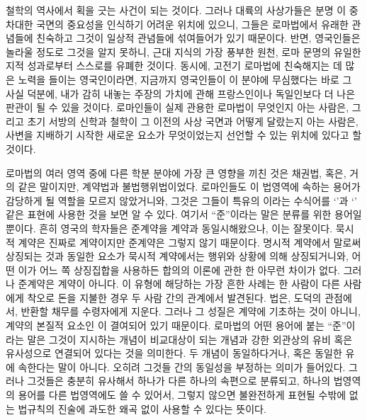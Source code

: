 철학의 역사에서 획을 긋는 사건이 되는 것이다.
그러나 대륙의 사상가들은
분명 이 중차대한 국면의 중요성을 인식하기 어려운 위치에 있으니,
그들은 로마법에서 유래한 관념들에 친숙하고
그것이 일상적 관념들에 섞여들어가 있기 때문이다.
반면, 영국인들은 놀라울 정도로 그것을 알지 못하니,
근대 지식의 가장 풍부한 원천,
로마 문명의 유일한 지적 성과로부터 스스로를 유폐한 것이다.
동시에,
고전기 로마법에 친숙해지는 데 많은 노력을 들이는
영국인이라면,
지금까지 영국인들이 이 분야에 무심했다는 바로 그 사실 덕분에,
내가 감히 내놓는 주장의 가치에 관해
프랑스인이나 독일인보다
더 나은 판관이 될 수 있을 것이다.
로마인들이 실제 관용한 로마법이 무엇인지 아는 사람은,
그리고 초기 서방의 신학과 철학이 그 이전의 사상 국면과 어떻게
달랐는지 아는 사람은,
사변을 지배하기 시작한 새로운 요소가 무엇이었는지
선언할 수 있는 위치에 있다고 할 것이다.

로마법의 여러 영역 중에 다른 학분 분야에 가장 큰 영향을 끼친 것은
채권법, 혹은, 거의 같은 말이지만, 계약법과 불법행위법이었다.
로마인들도
이 법영역에 속하는 용어가 감당하게 될 역할을 모르지 않았거니와,
그것은 그들이 특유의 이라는
수식어를 `'과
`' 같은 표현에 사용한 것을 보면 알 수 있다.
여기서 ``준''이라는 말은 분류를 위한 용어일 뿐이다.
흔히 영국의 학자들은 준계약을  계약과 동일시해왔으나,
이는 잘못이다.
묵시적 계약은 진짜로 계약이지만 준계약은 그렇지 않기 때문이다.
명시적 계약에서 말로써 상징되는 것과 동일한 요소가
묵시적 계약에서는 행위와 상황에 의해 상징되거니와,
어떤 이가
어느 쪽 상징집합을 사용하든
합의의 이론에 관한 한
아무런 차이가 없다.
그러나 준계약은 계약이 아니다.
이 유형에 해당하는 가장 흔한 사례는
한 사람이 다른 사람에게 착오로 돈을 지불한 경우 두 사람 간의 관계에서 발견된다.
법은, 도덕의 관점에서,
반환할 채무를 수령자에게 지운다.
그러나 그 성질은 계약에 기초하는 것이 아니니,
계약의 본질적 요소인 이 결여되어 있기 때문이다.
로마법의 어떤 용어에 붙는
``준''이라는 말은 그것이 지시하는 개념이
비교대상이 되는 개념과 강한 외관상의 유비 혹은 유사성으로
연결되어 있다는 것을 의미한다.
두 개념이 동일하다거나, 혹은 동일한 유에 속한다는 말이 아니다.
오히려
그것들 간의 동일성을 부정하는 의미가 들어있다.
그러나 그것들은 충분히 유사해서
하나가 다른 하나의 속편으로
분류되고,
하나의 법영역의 용어를 다른 법영역에도 쓸 수 있어서,
그렇지 않으면 불완전하게 표현될 수밖에 없는 법규칙의 진술에
과도한 왜곡 없이 사용할 수 있다는 뜻이다.

